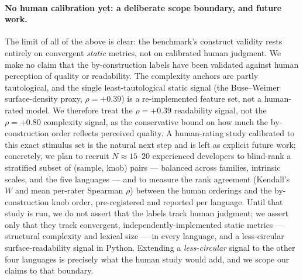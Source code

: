 \paragraph{No human calibration yet: a deliberate scope boundary, and future work.}
The limit of all of the above is clear: the benchmark's construct validity
rests entirely on convergent \emph{static} metrics, not on calibrated human judgment. We
make no claim that the by-construction labels have been validated against human
perception of quality or readability. The complexity anchors are partly tautological, and
the single least-tautological static signal (the Buse--Weimer surface-density proxy,
$\rho=+0.39$) is a re-implemented feature set, not a human-rated model. We therefore treat
the $\rho=+0.39$ readability signal, not the $\rho=+0.80$ complexity signal, as the
conservative bound on how much the by-construction order reflects perceived quality. A
human-rating study calibrated to this exact stimulus set is the natural next step and is
left as explicit future work; concretely, we plan to recruit $N\approx15$--$20$
experienced developers to blind-rank a stratified subset of (sample, knob) pairs ---
balanced across families, intrinsic scales, and the five languages --- and to measure the
rank agreement (Kendall's $W$ and mean per-rater Spearman $\rho$) between the human
orderings and the by-construction knob order, pre-registered and reported per language.
Until that study is run, we do not assert that the labels track human judgment; we assert
only that they track convergent, independently-implemented static metrics --- structural
complexity and lexical size --- in every language, and a less-circular surface-readability
signal in Python. Extending a \emph{less-circular} signal to the other four languages is
precisely what the human study would add, and we scope our claims to that boundary.
